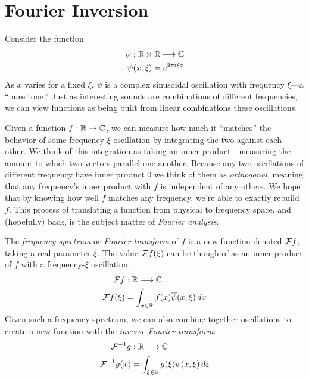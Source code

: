 
  \chapter{Fourier Inversion}
  \label{ch:fourier}

    Consider the function
    \begin{align*}
      \psi:\mathbb{R}\times\mathbb{R}\longrightarrow\mathbb{C}\\
      \psi(x,\xi) = e^{2\pi i \xi x}
    \end{align*}
    As $x$ varies for a fixed $\xi$, $\psi$ is a complex sinusoidal oscillation with frequency $\xi$\footnotemark---a ``pure tone.''
    Just as interesting sounds are combinations of different frequencies, we can view functions as being built from linear combinations these oscillations.

    Given a function $f:\mathbb{R}\rightarrow\mathbb{C}$, we can measure how much it ``matches'' the behavior of some frequency-$\xi$ oscillation by integrating the two against each other.
    We think of this integration as taking an inner product---measuring the amount to which two vectors parallel one another.
    Because any two oscillations of different frequency have inner product 0 we think of them as \emph{orthogonal}, meaning that any frequency's inner product with $f$ is independent of any others.
    We hope that by knowing how well $f$ matches any frequency, we're able to exactly rebuild $f$.
    This process of translating a function from physical to frequency space, and (hopefully) back, is the subject matter of \emph{Fourier analysis}.

    \begin{defn}
      The \emph{frequency spectrum} or \emph{Fourier transform} of $f$ is a new function denoted $\mathcal{F} f$, taking a real parameter $\xi$.
      The value $\mathcal{F} f(\xi)$ can be though of as an inner product of $f$ with a frequency-$\xi$ oscillation:
      \begin{align*}
        \mathcal{F} f&:\mathbb{R}\longrightarrow\mathbb{C}\\
        \mathcal{F} f(\xi) &= \int_{x\in\mathbb{R}} f(x)\overline\psi(x,\xi)\,dx
      \end{align*}
      Given such a frequency spectrum, we can also combine together oscillations to create a new function with the \emph{inverse Fourier transform}:
      \begin{align*}
        \mathcal{F}^{-1}g&:\mathbb{R}\longrightarrow\mathbb{C}\\
        \mathcal{F}^{-1}g(x) &= \int_{\xi\in\mathbb{R}} g(\xi)\psi(x,\xi)\,d\xi
      \end{align*}
    \end{defn}

